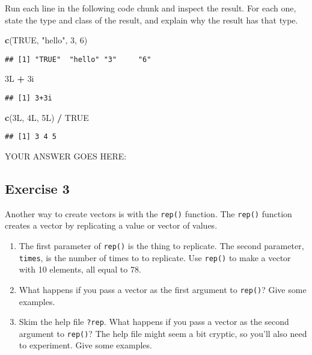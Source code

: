\documentclass[
]{article}
\newenvironment{Shaded}{\begin{snugshade}}{\end{snugshade}}
\newcommand{\DecValTok}[1]{\textcolor[rgb]{0.00,0.00,0.81}{#1}}
\newcommand{\KeywordTok}[1]{\textcolor[rgb]{0.13,0.29,0.53}{\textbf{#1}}}
\newcommand{\NormalTok}[1]{#1}
\newcommand{\OperatorTok}[1]{\textcolor[rgb]{0.81,0.36,0.00}{\textbf{#1}}}
\newcommand{\OtherTok}[1]{\textcolor[rgb]{0.56,0.35,0.01}{#1}}
\newcommand{\StringTok}[1]{\textcolor[rgb]{0.31,0.60,0.02}{#1}}
\begin{document}
Run each line in the following code chunk and inspect the result. For
each one, state the type and class of the result, and explain why the
result has that type.

\begin{Shaded}
\begin{Highlighting}[]
\KeywordTok{c}\NormalTok{(}\OtherTok{TRUE}\NormalTok{, }\StringTok{"hello"}\NormalTok{, }\DecValTok{3}\NormalTok{, }\DecValTok{6}\NormalTok{)}
\end{Highlighting}
\end{Shaded}

\begin{verbatim}
## [1] "TRUE"  "hello" "3"     "6"
\end{verbatim}

\begin{Shaded}
\begin{Highlighting}[]
\NormalTok{3L }\OperatorTok{+}\StringTok{ }\NormalTok{3i}
\end{Highlighting}
\end{Shaded}

\begin{verbatim}
## [1] 3+3i
\end{verbatim}

\begin{Shaded}
\begin{Highlighting}[]
\KeywordTok{c}\NormalTok{(3L, 4L, 5L) }\OperatorTok{/}\StringTok{ }\OtherTok{TRUE}
\end{Highlighting}
\end{Shaded}

\begin{verbatim}
## [1] 3 4 5
\end{verbatim}

YOUR ANSWER GOES HERE:

\hypertarget{exercise-3}{%
\subsection{Exercise 3}\label{exercise-3}}

Another way to create vectors is with the \texttt{rep()} function. The
\texttt{rep()} function creates a vector by replicating a value or
vector of values.

\begin{enumerate}
\def\labelenumi{\arabic{enumi}.}
\item
  The first parameter of \texttt{rep()} is the thing to replicate. The
  second parameter, \texttt{times}, is the number of times to to
  replicate. Use \texttt{rep()} to make a vector with 10 elements, all
  equal to 78.
\item
  What happens if you pass a vector as the first argument to
  \texttt{rep()}? Give some examples.
\item
  Skim the help file \texttt{?rep}. What happens if you pass a vector as
  the second argument to \texttt{rep()}? The help file might seem a bit
  cryptic, so you'll also need to experiment. Give some examples.
\end{enumerate}
\end{document}
